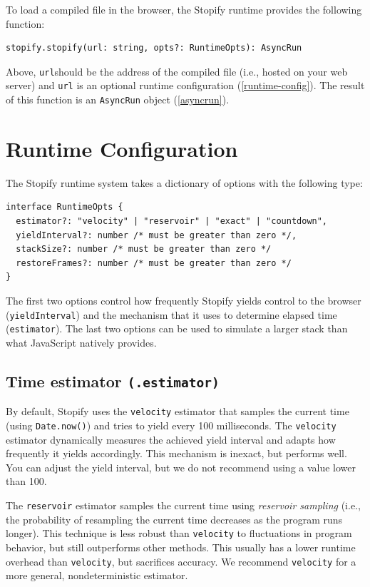 \documentclass[10pt]{book}
\begin{document}
\lstset{language=js}
To load a compiled file in the browser, the Stopify runtime provides
the following function:
\begin{lstlisting}
stopify.stopify(url: string, opts?: RuntimeOpts): AsyncRun
\end{lstlisting}

Above, \lstinline|url|should be the address of the compiled file (i.e., hosted on
your web server) and \lstinline|url| is an optional runtime configuration
(\cref{runtime-config}). The result of this function is an \lstinline|AsyncRun|
object (\cref{asyncrun}).

\section{Runtime Configuration\label{runtime-config}}

The Stopify runtime system takes a dictionary of options with the
following type:

\lstset{language=js}
\begin{lstlisting}
interface RuntimeOpts {
  estimator?: "velocity" | "reservoir" | "exact" | "countdown",
  yieldInterval?: number /* must be greater than zero */,
  stackSize?: number /* must be greater than zero */
  restoreFrames?: number /* must be greater than zero */
}
\end{lstlisting}

The first two options control how frequently Stopify yields control to the browser
(\lstinline|yieldInterval|) and the mechanism that it uses to determine
elapsed time (\lstinline|estimator|). The last two options can be used
to simulate a larger stack than what JavaScript natively provides.

\subsection{Time estimator \texttt{(.estimator)} }\label{estimator}
By default, Stopify uses the \texttt{velocity} estimator that samples the current
time (using \lstinline|Date.now()|) and tries to yield every 100 milliseconds.
The \texttt{velocity} estimator dynamically measures the achieved yield interval
and adapts how frequently it yields accordingly. This mechanism is inexact, but
performs well. You can adjust the yield interval, but we do not recommend using
a value lower than 100.

The \texttt{reservoir} estimator samples the current time using
\emph{reservoir sampling} (i.e., the probability of resampling the current time
decreases as the program runs longer). This technique
is less robust than \texttt{velocity} to fluctuations in program behavior, but
still outperforms other methods. This usually has a lower runtime overhead than
\texttt{velocity}, but sacrifices accuracy. We recommend \texttt{velocity} for a
more general, nondeterministic estimator.
\end{document}
